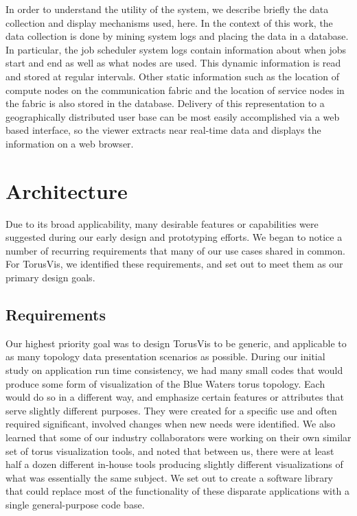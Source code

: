 \documentclass[
    10pt,
    conference,
    compsocconf
]{IEEEtran}
\begin{document}
    In order to understand the utility of the system, we describe briefly the
    data collection and display mechanisms used, here.  In the context of this
    work, the data collection is done by mining system logs and placing the data
    in a database. In particular, the job scheduler system logs contain
    information about when jobs start and end as well as what nodes are used.
    This dynamic information is read and stored at regular intervals.  Other
    static information such as the location of compute nodes on the
    communication fabric and the location of service nodes in the fabric is also
    stored in the database.  Delivery of this representation to a geographically
    distributed user base can be most easily accomplished via a web based
    interface, so the viewer extracts near real-time data and displays the
    information on a web browser.


\section{Architecture}
    Due to its broad applicability, many desirable features or capabilities were
    suggested during our early design and prototyping efforts.  We began to
    notice a number of recurring requirements that many of our use cases shared
    in common.  For TorusVis, we identified these requirements, and set out to
    meet them as our primary design goals.

    \subsection{Requirements}
        Our highest priority goal was to design TorusVis to be generic, and
        applicable to as many topology data presentation scenarios as possible.
        During our initial study on application run time consistency, we had
        many small codes that would produce some form of visualization of the
        Blue Waters torus topology.  Each would do so in a different way, and
        emphasize certain features or attributes that serve slightly different
        purposes.  They were created for a specific use and often required
        significant, involved changes when new needs were identified.  We also
        learned that some of our industry collaborators were working on their
        own similar set of torus visualization tools, and noted that between us,
        there were at least half a dozen different in-house tools producing
        slightly different visualizations of what was essentially the same
        subject.  We set out to create a software library that could replace
        most of the functionality of these disparate applications with a single
        general-purpose code base.
    
\end{document}
